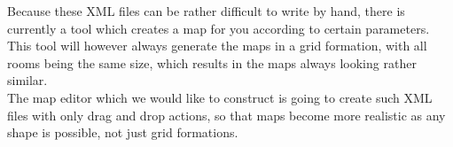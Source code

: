 Because these XML files can be rather difficult to write by hand, there is currently a tool which creates a map for you according to certain parameters. This tool will however always generate the maps in a grid formation, with all rooms being the same size, which results in the maps always looking rather similar. \\
The map editor which we would like to construct is going to create such XML files with only drag and drop actions, so that maps become more realistic as any shape is possible, not just grid formations.